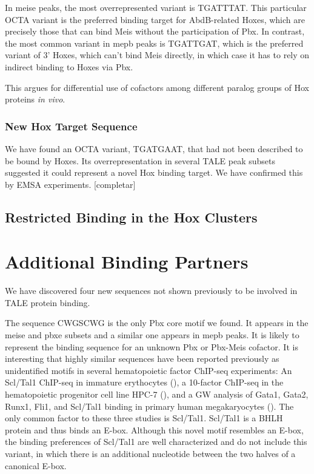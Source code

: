 In \ac{meise} peaks, the most overrepresented variant is TGATTTAT. This particular \ac{OCTA} variant is the preferred binding target for AbdB-related Hoxes, which are precisely those that can bind Meis without the participation of Pbx. In contrast, the most common variant in \ac{mepb} peaks is TGATTGAT, which is the preferred variant of 3' Hoxes, which can't bind Meis directly, in which case it has to rely on indirect binding to Hoxes via Pbx.

This argues for differential use of cofactors among different paralog groups of Hox proteins \textit{in vivo}. 

\subsubsection{New Hox Target Sequence}

We have found an \ac{OCTA} variant, TGATGAAT, that had not been described to be bound by Hoxes. Its overrepresentation in several \ac{TALE} peak subsets suggested it could represent a novel Hox binding target. We have confirmed this by \ac{EMSA} experiments. [completar]



\subsection{Restricted Binding in the Hox Clusters}



\section{Additional Binding Partners}

We have discovered four new sequences not shown previously to be involved in \ac{TALE} protein binding. 

The sequence CWGSCWG is the only Pbx core motif we found. It appears in the \ac{meise} and \ac{pbxe} subsets and a similar one appears in \ac{mepb} peaks. It is likely to represent the binding sequence for an unknown Pbx or Pbx-Meis cofactor. It is interesting that highly similar sequences have been reported previously as unidentified motifs in several hematopoietic factor ChIP-seq experiments: An Scl/Tal1 ChIP-seq in immature erythocytes (\cite{Kassouf2010}), a 10-factor ChIP-seq in the hematopoietic progenitor cell line HPC-7 (\cite{Wilson2010}), and a \ac{GW} analysis of Gata1, Gata2, Runx1, Fli1, and Scl/Tal1 binding in primary human megakaryocytes (\cite{Tijssen2011}). The only common factor to these three studies is Scl/Tal1. Scl/Tal1 is a \ac{BHLH} protein and thus binds an E-box. Although this novel motif resembles an E-box, the binding preferences of Scl/Tal1 are well characterized and do not include this variant, in which there is an additional nucleotide between the two halves of a canonical E-box. %

